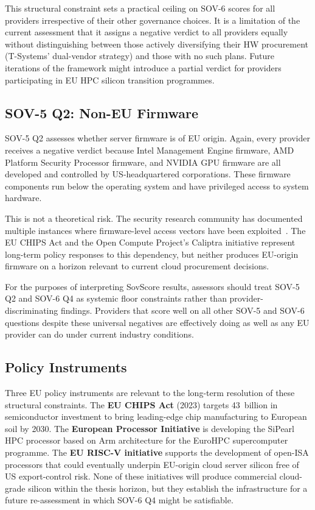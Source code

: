 This structural constraint sets a practical ceiling on SOV-6 scores for all providers irrespective of their other governance choices. It is a limitation of the current assessment that it assigns a negative verdict to all providers equally without distinguishing between those actively diversifying their HW procurement (T-Systems' dual-vendor strategy) and those with no such plans. Future iterations of the framework might introduce a partial verdict for providers participating in EU HPC silicon transition programmes.

\subsection{SOV-5 Q2: Non-EU Firmware}

SOV-5 Q2 assesses whether server firmware is of EU origin. Again, every provider receives a negative verdict because Intel Management Engine firmware, AMD Platform Security Processor firmware, and NVIDIA GPU firmware are all developed and controlled by US-headquartered corporations. These firmware components run below the operating system and have privileged access to system hardware.

This is not a theoretical risk. The security research community has documented multiple instances where firmware-level access vectors have been exploited~\cite{ENISA_EUCS_2023}. The EU CHIPS Act and the Open Compute Project's Caliptra initiative represent long-term policy responses to this dependency, but neither produces EU-origin firmware on a horizon relevant to current cloud procurement decisions.

For the purposes of interpreting SovScore results, assessors should treat SOV-5 Q2 and SOV-6 Q4 as systemic floor constraints rather than provider-discriminating findings. Providers that score well on all other SOV-5 and SOV-6 questions despite these universal negatives are effectively doing as well as any EU provider can do under current industry conditions.

\subsection{Policy Instruments}

Three EU policy instruments are relevant to the long-term resolution of these structural constraints. The \textbf{EU CHIPS Act} (2023) targets \texteuro{}43~billion in semiconductor investment to bring leading-edge chip manufacturing to European soil by 2030. The \textbf{European Processor Initiative} is developing the SiPearl HPC processor based on Arm architecture for the EuroHPC supercomputer programme. The \textbf{EU RISC-V initiative} supports the development of open-ISA processors that could eventually underpin EU-origin cloud server silicon free of US export-control risk. None of these initiatives will produce commercial cloud-grade silicon within the thesis horizon, but they establish the infrastructure for a future re-assessment in which SOV-6 Q4 might be satisfiable.

